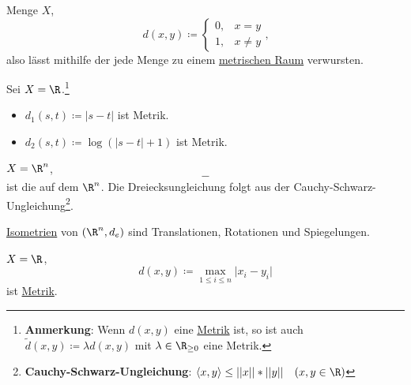 \begin{example}
  \label{bsp:trivialeMetrik}
  Menge $ X $,
  \begin{equation*}
    d(x, y) \coloneqq \begin{cases}
    0, &x = y \\
    1, & x \neq y
  \end{cases}\text{,}
  \end{equation*}
  also lässt mithilfe der  jede Menge zu einem \hyperref[def:metrischerRaum]{metrischen Raum} verwursten. 
\end{example}

\begin{example}
  \label{bsp:simpleMetriken}
  Sei $ X = \R $.\footnote{\textbf{Anmerkung}: Wenn $ d(x, y) $ eine \hyperref[def:metrik]{Metrik} ist, so ist auch $ \widetilde{d}(x, y) \coloneqq \lambda d(x, y) $ mit $ \lambda \in \R_{\geq 0} $ eine Metrik.}
  \begin{itemize}
    \item $ d_1(s, t) \coloneqq |s-t| $ ist Metrik.
    \item $ d_2(s, t) \coloneqq \log(|s-t|+1) $ ist Metrik.
  \end{itemize}
\end{example}

\begin{example}
  \label{bsp:standardmetrik}
  $ X = \R^n $,
  \begin{equation*}
    -
  \end{equation*}
  ist die  auf dem $ \R^n $. Die Dreiecksungleichung folgt aus der Cauchy-Schwarz-Ungleichung\footnote{\textbf{Cauchy-Schwarz-Ungleichung}: $ \langle x, y \rangle \leq ||x||*||y|| \quad (x, y \in \R) $}.
\end{example}

\begin{remark}[aus LA II]
  \hyperref[def:isometrie]{Isometrien} von $ (\R^n, d_e) $ sind Translationen, Rotationen und Spiegelungen.
\end{remark}

\begin{example}[Maximumsmetrik]
  \label{bsp:maximumsmetrik}
  $ X = \R $,
  \begin{equation*}
    d(x, y) \coloneqq \underset{1 \leq i \leq n}{\max} \vert x_i-y_i \vert
  \end{equation*}
  ist \hyperref[def:metrik]{Metrik}.
\end{example}

